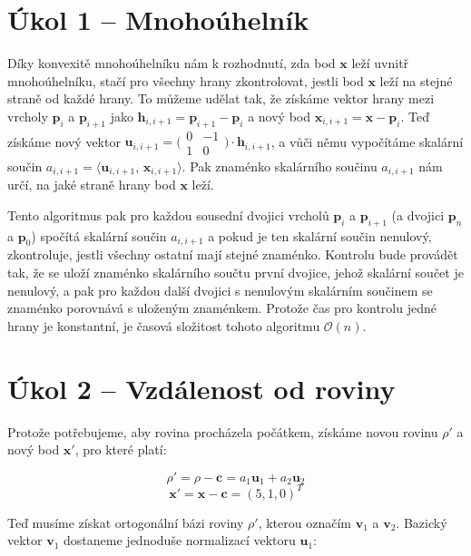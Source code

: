 \documentclass{fkssolpub}
\author{Ondřej Sedláček}
\begin{document}
\section{Úkol 1 -- Mnohoúhelník}

Díky konvexitě mnohoúhelníku nám k rozhodnutí, zda bod $\mathbf{x}$ leží uvnitř
mnohoúhelníku, stačí pro všechny hrany zkontrolovat, jestli bod $\mathbf{x}$ leží
na stejné straně od každé hrany. To můžeme udělat tak, že získáme vektor hrany
mezi vrcholy $\mathbf{p}_i$ a $\mathbf{p}_{i+1}$ jako 
$\mathbf{h}_{i,i+1} = \mathbf{p}_{i+1} - \mathbf{p}_i$ a nový bod $\mathbf{x}_{i,i+1} = 
\mathbf{x} - \mathbf{p}_i$. Teď získáme nový vektor $\mathbf{u}_{i,i+1} = 
\big( \begin{smallmatrix}
  0 & -1 \\ 1 & 0 
\end{smallmatrix} \big) \cdot \mathbf{h}_{i,i+1}$, a vůči němu vypočítáme skalární
součin $a_{i,i+1} = \langle \mathbf{u}_{i,i+1}, \, \mathbf{x}_{i,i+1} \rangle$. Pak 
znaménko skalárního součinu $a_{i,i+1}$ nám určí, na jaké straně hrany bod 
$\mathbf{x}$ leží.

Tento algoritmus pak pro každou sousední dvojici vrcholů $\mathbf{p}_i$ a 
$\mathbf{p}_{i+1}$ (a dvojici $\mathbf{p}_n$ a $\mathbf{p}_0$) spočítá 
skalární součin $a_{i, i+1}$ a pokud je ten skalární součin nenulový, zkontroluje,
jestli všechny ostatní mají stejné znaménko. Kontrolu bude provádět tak, že
se uloží znaménko skalárního součtu první dvojice, jehož skalární součet je
nenulový, a pak pro každou další dvojici s nenulovým skalárním součinem se 
znaménko porovnává s uloženým znaménkem. Protože čas pro kontrolu jedné hrany
je konstantní, je časová složitost tohoto algoritmu $\mathcal{O}(n)$.

\section{Úkol 2 -- Vzdálenost od roviny}

Protože potřebujeme, aby rovina procházela počátkem, získáme novou rovinu $\rho'$
a nový bod $\mathbf{x}'$, pro které platí:

\[
  \rho' = \rho - \mathbf{c} = a_1 \mathbf{u}_1 + a_2 \mathbf{u}_2
\]
\[
  \mathbf{x}' = \mathbf{x} - \mathbf{c} = (5,1,0)^T
\]

Teď musíme získat ortogonální bázi roviny $\rho'$, kterou označím $\mathbf{v}_1$ a
$\mathbf{v}_2$. Bazický vektor $\mathbf{v}_1$ dostaneme jednoduše normalizací
vektoru $\mathbf{u}_1$:
\end{document}
